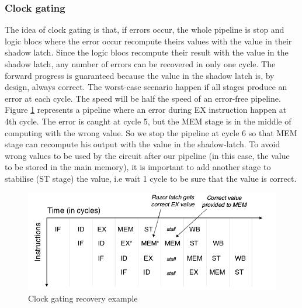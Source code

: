 \documentclass[fleqn,envcountsame,runningheads,10pt,a4paper]{llncs}
\begin{document}
\subsubsection{Clock gating}
The idea of clock gating is that, if errors occur, the whole pipeline is stop and logic blocs where the error occur recompute theirs values with the value in their shadow latch. Since the logic blocs recompute their result with the value in the shadow latch, any number of errors can be recovered in only one cycle. The forward progress is guaranteed because the value in the shadow latch is, by design, always correct. The worst-case scenario happen if all stages produce an error at each cycle. The speed will be half the speed of an error-free pipeline. 
Figure \ref{figure4} represents a pipeline where an error during EX instruction happen at 4th cycle. The error is caught at cycle 5, but the MEM stage is in the middle of computing with the wrong value. So we stop the pipeline at cycle 6 so that MEM stage can recompute his output with the value in the shadow-latch. To avoid wrong values to be used by the circuit after our pipeline (in this case, the value to be stored in the main memory), it is important to add another stage to stabilise (ST stage) the value, i.e wait 1 cycle to be sure that the value is correct. 
\begin{figure}[!h]
    \centering
   \centerline{\includegraphics[scale=0.3]{./img/figure4.png}}
   \caption{\label{figure4}Clock gating recovery example\cite{Barthou:1998}}
\end{figure}
\end{document}
